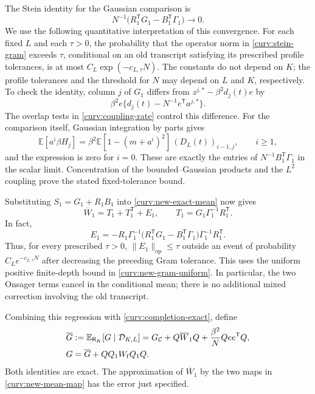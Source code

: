 \documentclass[11pt,reqno]{amsart}
\begin{document}
The Stein identity for the Gaussian comparison is
\begin{equation}\label{curv:stein-gram}
 N^{-1}\bigl(R_1^{\mathsf T}G_1-B_1^{\mathsf T}\Gamma_1\bigr)
 \longrightarrow0.
\end{equation}
We use the following quantitative interpretation of this convergence.
For each fixed $L$ and each $\tau>0$, the probability that the operator
norm in \eqref{curv:stein-gram} exceeds $\tau$, conditional on an old
transcript satisfying its prescribed profile tolerances, is at most
$C_L\exp(-c_{L,\tau}N)$. The constants do not depend on $K$; the profile
tolerances and the threshold for $N$ may depend on $L$ and $K$,
respectively. To check the identity, column $j$ of $G_1$ differs from
$z^{j,*}-\beta^2d_j(t)e$ by
\[
 \beta^2e\bigl\{d_j(t)-N^{-1}e^{\mathsf T}a^{j,*}\bigr\}.
\]
The overlap tests in \eqref{curv:coupling-rate} control this difference.
For the comparison itself, Gaussian integration by parts gives
\[
 \mathbb E[a^i\beta H_j]
  =\beta^2\mathbb E[1-(m+a^i)^2]\,
       (D_L(t))_{i-1,j},\qquad i\ge1,
\]
and the expression is zero for $i=0$. These are exactly the entries of
$N^{-1}B_1^{\mathsf T}\Gamma_1$ in the scalar limit. Concentration of the
bounded--Gaussian products and the $L^2$ coupling prove the stated
fixed-tolerance bound.

Substituting $S_1=G_1+R_1B_1$ into
\eqref{curv:new-exact-mean} now gives
\begin{equation}\label{curv:new-mean-map}
 \overline W_1=T_1+T_1^{\mathsf T}+E_1,
 \qquad T_1=G_1\Gamma_1^{-1}R_1^{\mathsf T}.
\end{equation}
In fact,
\[
 E_1=-R_1\Gamma_1^{-1}
       \bigl(R_1^{\mathsf T}G_1-B_1^{\mathsf T}\Gamma_1\bigr)
                  \Gamma_1^{-1}R_1^{\mathsf T}.
\]
Thus, for every prescribed $\tau>0$, $\|E_1\|_{\mathrm{op}}\le\tau$
outside an event of probability $C_L e^{-c_{L,\tau}N}$ after decreasing
the preceding Gram tolerance. This uses the uniform positive
finite-depth bound in \eqref{curv:new-gram-uniform}. In particular,
the two Onsager terms cancel in the conditional mean; there is no
additional mixed correction involving the old transcript.

Combining this regression with \eqref{curv:completion-exact}, define
\begin{align}
 \overline G&:=\mathbb E_{\mathsf R_K}[G\mid\mathcal D_{K,L}]
       =G_{\mathcal C}+Q\overline W_1Q
                   +\frac{\beta^2}{N}Qee^{\mathsf T}Q,\notag\\
 G&=\overline G+QQ_1W_{\mathrm f}Q_1Q.\label{curv:conditional-G}
\end{align}
Both identities are exact. The approximation of $\overline W_1$ by the
two maps in \eqref{curv:new-mean-map} has the error just specified.
\end{document}

